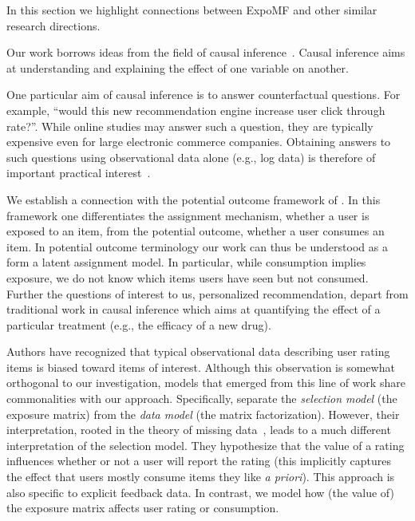 In this section we highlight connections between ExpoMF and other
similar research directions. 



 Our work borrows ideas from the field of
causal inference~\cite{pearl2009causality,imbens2015causal}. Causal inference aims at understanding and
explaining the effect of one variable on another. 

One particular aim of causal inference is to answer counterfactual
questions. For example, ``would this new recommendation engine increase
user click through rate?''.  While online studies may answer such a question, they are
typically expensive even for large electronic commerce companies.
Obtaining answers to such questions using observational data alone (e.g.,
log data) is therefore of important practical
interest~\cite{bottou2015counterfactual,li2010contextual,swaminathan2015counterfactual}.

We establish a connection with the potential outcome framework of
\citet{rubin1974ece}. In this framework one differentiates the assignment mechanism,
whether a user is exposed to an item, from the potential outcome, whether a
user consumes an item. In potential outcome terminology our work can thus
be understood as a form a latent assignment model. In particular, while
consumption implies exposure, we do not know which items users have 
seen but not consumed. Further the questions of interest to us,
personalized recommendation, depart from traditional work in causal
inference which aims at quantifying the effect of a particular treatment
(e.g., the efficacy of a new drug). 


 Authors have recognized that typical
observational data describing user rating items is biased toward items of
interest. Although this observation is somewhat orthogonal to our
investigation, models that emerged from this line of work share
commonalities with our approach.  Specifically, \citet{DBLP:conf/uai/MarlinZRS07,ling12response}
separate the \emph{selection model} (the exposure matrix) from the
\emph{data model} (the matrix factorization). However, their
interpretation, rooted in the theory of missing data~\cite{little1986statistical}, leads to a
much different interpretation of the selection model. They hypothesize
that the value of a rating influences whether or not a user will report
the rating (this implicitly captures the effect that users mostly consume
items they like \emph{a priori}). This approach is also specific to
explicit feedback data. In contrast, we model how (the value of) the
exposure matrix affects user rating or consumption. 


